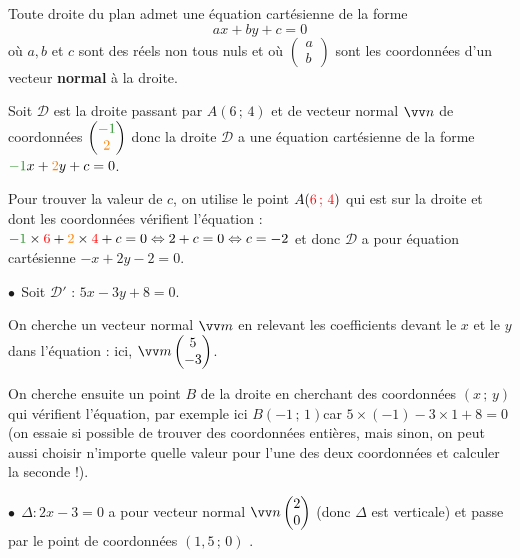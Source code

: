 \documentclass[a4paper,11pt]{article}
\begin{document}
\begin{cthm}
Toute droite du plan admet une équation cartésienne de la forme \[ax+by+c=0\]%
où $a, b $ et $c$ sont des réels non tous nuls et où $\begin{pmatrix}  a\\ b \end{pmatrix}$ sont les coordonnées d'un vecteur \textbf{normal} à la droite.
\end{cthm}

\begin{cexemple}[ n°1]
Soit $\mathscr{D}$ est la droite passant par $A(6\,;\,4)$ et de vecteur normal $\vect{n}$ de coordonnées $\begin{pmatrix} \textcolor{ForestGreen}{-1}\\ \textcolor{orange}{2} \end{pmatrix}$ donc la droite $\mathscr{D}$ a une équation cartésienne de la forme $\textcolor{ForestGreen}{-1}x+\textcolor{orange}{2}y+c=0$.

Pour trouver la valeur de $c$, on utilise le point $A(\textcolor{red}{6\,;\,4})$ qui est sur la droite et dont les coordonnées vérifient l'équation : $\textcolor{ForestGreen}{-1}\times \textcolor{red}{6} + \textcolor{orange}{2}\times \textcolor{red}{4} +c=0 \ssi 2+c=0 \ssi c = -2$ et donc $\mathscr{D}$ a pour équation cartésienne $-x+2y-2=0$.
\end{cexemple}

\begin{cexemple}[ n°2]
$\bullet~~$Soit  $\mathscr{D'}$ : $5x-3y+8=0$.

On cherche un vecteur normal $\vect{m}$ en relevant les coefficients devant le $x$ et le $y$ dans l'équation : ici, $\vect{m}\begin{pmatrix}	5\\-3 \end{pmatrix}$.

On cherche ensuite un point $B$ de la droite en cherchant des coordonnées $(x\,;\,y)$ qui vérifient l'équation, par exemple ici $B(-1\,;\,1)$car $5 \times (-1) - 3 \times 1 +8 = 0$ (on essaie si possible de trouver des coordonnées entières, mais sinon, on peut aussi choisir n'importe quelle valeur pour l'une des deux coordonnées et calculer la seconde !).

\medskip

$\bullet~~\Delta : 2x-3=0$ a pour vecteur normal $\vect{n} \begin{pmatrix}	2\\0 \end{pmatrix}$ (donc $\Delta$ est verticale) et passe par le point de coordonnées $(1,5\,;\,0)$ . 
\end{cexemple}
\end{document}
